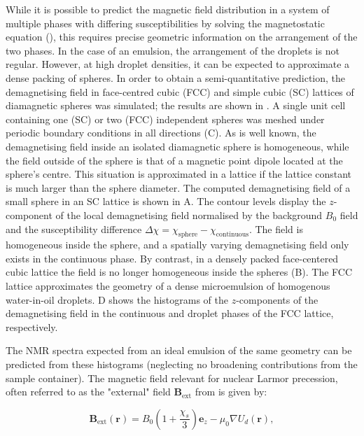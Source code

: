 While it is possible to predict the magnetic field distribution in a system of
multiple phases with differing susceptibilities by solving the magnetostatic
equation (), this requires precise geometric information on the arrangement of the
two phases. In the case of an emulsion, the arrangement of the droplets is not
regular. However, at high droplet densities, it can be
expected to approximate  a dense packing of spheres. In order to obtain a
semi-quantitative prediction, the demagnetising field in
face-centred cubic  (FCC) and simple cubic (SC) lattices of diamagnetic spheres was simulated;
the results are shown in  . A single unit cell containing
one (SC) or
two (FCC) independent spheres was meshed under periodic boundary conditions in all
directions (C).
As is well known, the demagnetising field inside an isolated diamagnetic sphere
is homogeneous, while the field outside of the
sphere is that of a magnetic
point dipole located at the sphere's centre. This situation is approximated
in a lattice if the lattice constant is much larger than the sphere
diameter. The computed demagnetising field
of a small sphere in an SC lattice is shown in A.
The contour levels display the $z$-component of the local demagnetising field
normalised by the background $B_0$ field and the susceptibility difference
$\Delta\chi= \chi_\text{sphere}-\chi_\text{continuous}$. The field is homogeneous
inside the sphere, and a spatially varying demagnetising field only
exists in the continuous phase.
By contrast, in a
densely packed face-centered cubic lattice the field is no
longer homogeneous inside the spheres (B). The FCC
lattice approximates the geometry of a dense microemulsion of homogenous
water-in-oil droplets.  D shows the histograms of
the $z$-components of
the demagnetising field in the continuous and droplet phases of the FCC
lattice, respectively.

The NMR spectra expected from an ideal emulsion of the same geometry can
be predicted from these histograms
(neglecting no broadening contributions from the sample container).
The magnetic field relevant for nuclear Larmor precession, often referred
to as the "external" field \citep{Levitt:1996tg} $\mathbf{B}_\text{ext}$  from
 is given by:

\begin{equation}
\mathbf{B}_\text{ext}(\mathbf{r})
= B_0 (1+\frac{\chi_s}{3}) \mathbf{e}_z  - {\mu_0} \nabla U_d(\mathbf{r}),
\end{equation}

